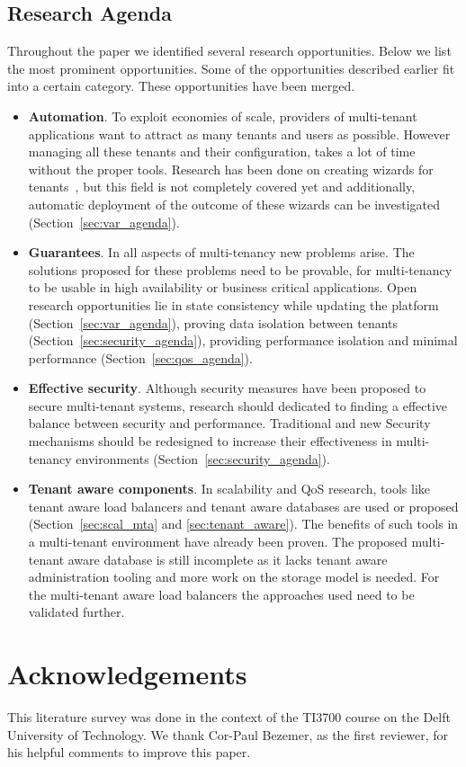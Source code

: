 \documentclass{article}
\newcommand{\highlight}[1]{\colorbox{yellow}{#1}}
\begin{document}
\subsection{Research Agenda}
\label{sec:ra}
Throughout the paper we identified several research opportunities. Below we list the most prominent opportunities. Some of the opportunities described earlier fit into a certain category. These opportunities have been merged.
\begin{itemize}

\item \textbf{Automation}. 
To exploit economies of scale, providers of multi-tenant applications want to attract as many tenants and users as possible. 
However managing all these tenants and their configuration, takes a lot of time without the proper tools. 
Research has been done on creating wizards for tenants~\cite{mietzner2008generation,mietzner2008defining}, but this field is not completely covered yet and additionally, automatic deployment of the outcome of these wizards can be investigated (Section~\ref{sec:var_agenda}).
\item \textbf{Guarantees}. 
In all aspects of multi-tenancy new problems arise. 
The solutions proposed for these problems need to be provable, for multi-tenancy to be usable in high availability or business critical applications. 
Open research opportunities lie in state consistency while updating the platform (Section~\ref{sec:var_agenda}), proving data isolation between tenants (Section~\ref{sec:security_agenda}), providing performance isolation and minimal performance (Section~\ref{sec:qos_agenda}).
\item \textbf{Effective security}.
Although security measures have been proposed to secure multi-tenant systems, research should dedicated to finding a effective balance between security and performance. Traditional and new Security mechanisms should be redesigned to increase their effectiveness in multi-tenancy environments (Section~\ref{sec:security_agenda}).
\item \textbf{Tenant aware components}.
In scalability and \ac{QoS} research, tools like tenant aware load balancers and tenant aware databases are used or proposed (Section~\ref{sec:scal_mta} and \ref{sec:tenant_aware}).
The benefits of such tools in a multi-tenant environment have already been proven.
The proposed multi-tenant aware database is still incomplete as it lacks tenant aware administration tooling and more work on the storage model is needed. 
For the multi-tenant aware load balancers the approaches used need to be validated further.

\end{itemize}

\section{Acknowledgements}
This literature survey was done in the context of the TI3700 course on the Delft University of Technology. We thank Cor-Paul Bezemer, as the first reviewer, for his helpful comments to improve this paper.



\end{document}

